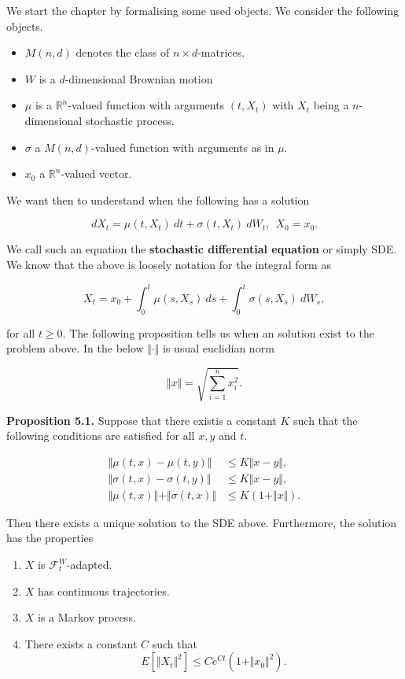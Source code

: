 \documentclass[
]{article}
\providecommand{\tightlist}{%
  \setlength{\itemsep}{0pt}\setlength{\parskip}{0pt}}
\begin{document}
We start the chapter by formalising some used objects. We consider the
following objects.

\begin{itemize}
\tightlist
\item
  \(M(n,d)\) denotes the class of \(n\times d\)-matrices.
\item
  \(W\) is a \(d\)-dimensional Brownian motion
\item
  \(\mu\) is a \(\mathbb{R}^n\)-valued function with arguments
  \((t,X_t)\) with \(X_t\) being a \(n\)-dimensional stochastic process.
\item
  \(\sigma\) a \(M(n,d)\)-valued function with arguments as in \(\mu\).
\item
  \(x_0\) a \(\mathbb{R}^n\)-valued vector.
\end{itemize}

We want then to understand when the following has a solution

\[
dX_t=\mu(t,X_t)\ dt + \sigma(t,X_t)\ dW_t,\ \ X_0=x_0.
\]

We call such an equation the \textbf{stochastic differential equation}
or simply SDE. We know that the above is loosely notation for the
integral form as

\[
X_t=x_0+\int_0^t\mu(s,X_s)\ ds +\int_0^t\sigma(s,X_s)\ dW_s,
\]

for all \(t\ge 0\). The following proposition tells us when an solution
exist to the problem above. In the below \(\Vert \cdot \Vert\) is usual
euclidian norm

\[
\Vert x\Vert=\sqrt{\sum_{i=1}^nx_i^2}.
\]

\textbf{Proposition 5.1.} Suppose that there existis a constant \(K\)
such that the following conditions are satisfied for all \(x,y\) and
\(t\).

\begin{align*}
\Vert \mu(t,x) - \mu(t,y) \Vert &\le K\Vert x-y\Vert,\\
\Vert \sigma(t,x) - \sigma(t,y) \Vert &\le K\Vert x-y\Vert,\\
\Vert \mu(t,x) \Vert +\Vert \sigma(t,x) \Vert&\le K(1+\Vert x\Vert).
\end{align*}

Then there exists a unique solution to the SDE above. Furthermore, the
solution has the properties

\begin{enumerate}
\def\labelenumi{\arabic{enumi}.}
\tightlist
\item
  \(X\) is \(\mathcal{F}_t^W\)-adapted.
\item
  \(X\) has continuous trajectories.
\item
  \(X\) is a Markov process.
\item
  There exists a constant \(C\) such that \[
    E[\Vert X_t\Vert^2]\le Ce^{Ct}(1+\Vert x_0\Vert^2).
    \]
\end{enumerate}
\end{document}
